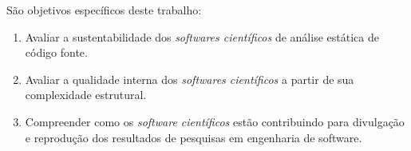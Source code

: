 São objetivos específicos deste trabalho:

\begin{enumerate}
  \item Avaliar a sustentabilidade dos {\it softwares científicos} de análise estática de código fonte.
  \item Avaliar a qualidade interna dos {\it softwares científicos} a partir de sua complexidade estrutural.
  \item Compreender como os {\it software científicos} estão contribuindo para divulgação e reprodução dos resultados de pesquisas em engenharia de software.
\end{enumerate}


